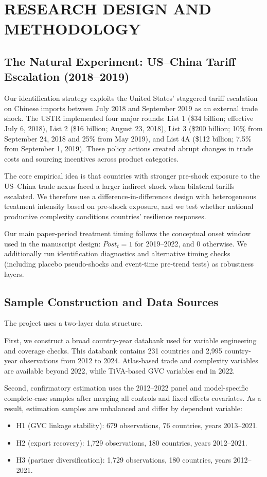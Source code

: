 \section{RESEARCH DESIGN AND METHODOLOGY}\label{sec3}

\subsection{The Natural Experiment: US--China Tariff Escalation (2018--2019)}

Our identification strategy exploits the United States' staggered tariff escalation on Chinese imports between July 2018 and September 2019 as an external trade shock. The USTR implemented four major rounds: List 1 (\$34 billion; effective July 6, 2018), List 2 (\$16 billion; August 23, 2018), List 3 (\$200 billion; 10\% from September 24, 2018 and 25\% from May 2019), and List 4A (\$112 billion; 7.5\% from September 1, 2019). These policy actions created abrupt changes in trade costs and sourcing incentives across product categories.

The core empirical idea is that countries with stronger pre-shock exposure to the US--China trade nexus faced a larger indirect shock when bilateral tariffs escalated. We therefore use a difference-in-differences design with heterogeneous treatment intensity based on pre-shock exposure, and we test whether national productive complexity conditions countries' resilience responses.

Our main paper-period treatment timing follows the conceptual onset window used in the manuscript design: $\textit{Post}_{t}=1$ for 2019--2022, and 0 otherwise. We additionally run identification diagnostics and alternative timing checks (including placebo pseudo-shocks and event-time pre-trend tests) as robustness layers.

\subsection{Sample Construction and Data Sources}

The project uses a two-layer data structure.

First, we construct a broad country-year databank used for variable engineering and coverage checks. This databank contains 231 countries and 2,995 country-year observations from 2012 to 2024. Atlas-based trade and complexity variables are available beyond 2022, while TiVA-based GVC variables end in 2022.

Second, confirmatory estimation uses the 2012--2022 panel and model-specific complete-case samples after merging all controls and fixed effects covariates. As a result, estimation samples are unbalanced and differ by dependent variable:
\begin{itemize}
\item H1 (GVC linkage stability): 679 observations, 76 countries, years 2013--2021.
\item H2 (export recovery): 1,729 observations, 180 countries, years 2012--2021.
\item H3 (partner diversification): 1,729 observations, 180 countries, years 2012--2021.
\end{itemize}

